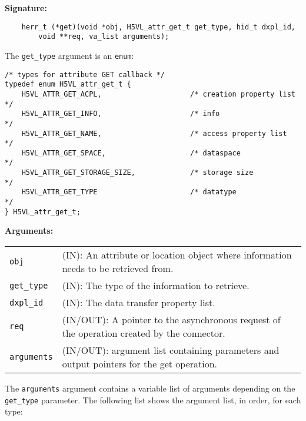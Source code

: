 \begin{mdframed}[style=bgbox]
\textbf{Signature:}
\begin{lstlisting}
    herr_t (*get)(void *obj, H5VL_attr_get_t get_type, hid_t dxpl_id, 
        void **req, va_list arguments);
\end{lstlisting}

The \texttt{get\_type} argument is an \texttt{enum}:
\begin{lstlisting}
/* types for attribute GET callback */
typedef enum H5VL_attr_get_t {                                                   
    H5VL_ATTR_GET_ACPL,                     /* creation property list              */
    H5VL_ATTR_GET_INFO,                     /* info                                */
    H5VL_ATTR_GET_NAME,                     /* access property list                */
    H5VL_ATTR_GET_SPACE,                    /* dataspace                           */
    H5VL_ATTR_GET_STORAGE_SIZE,             /* storage size                        */
    H5VL_ATTR_GET_TYPE                      /* datatype                            */
} H5VL_attr_get_t; 
\end{lstlisting}

\textbf{Arguments:}\\
\begin{tabular}{l p{13.5cm}}
  \texttt{obj} & (IN): An attribute or location object where information
  needs to be retrieved from.\\
  \texttt{get\_type} & (IN): The type of the information to retrieve.\\
  \texttt{dxpl\_id} & (IN): The data transfer property list.\\
  \texttt{req} & (IN/OUT): A pointer to the asynchronous request of the
  operation created by the connector.\\
  \texttt{arguments} & (IN/OUT): argument list containing parameters and
  output pointers for the get operation. \\
\end{tabular}
\end{mdframed}

The \texttt{arguments} argument contains a variable list of arguments
depending on the \texttt{get\_type} parameter. The following list shows
the argument list, in order, for each type:

